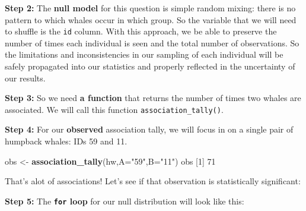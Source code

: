 \documentclass[]{book}
\newenvironment{Shaded}{\begin{snugshade}}{\end{snugshade}}
\newcommand{\ControlFlowTok}[1]{\textcolor[rgb]{0.13,0.29,0.53}{\textbf{#1}}}
\newcommand{\DataTypeTok}[1]{\textcolor[rgb]{0.13,0.29,0.53}{#1}}
\newcommand{\DecValTok}[1]{\textcolor[rgb]{0.00,0.00,0.81}{#1}}
\newcommand{\KeywordTok}[1]{\textcolor[rgb]{0.13,0.29,0.53}{\textbf{#1}}}
\newcommand{\NormalTok}[1]{#1}
\newcommand{\OperatorTok}[1]{\textcolor[rgb]{0.81,0.36,0.00}{\textbf{#1}}}
\newcommand{\StringTok}[1]{\textcolor[rgb]{0.31,0.60,0.02}{#1}}
\begin{document}
\textbf{Step 2:} The \textbf{null model} for this question is simple random mixing: there is no pattern to which whales occur in which group. So the variable that we will need to shuffle is the \texttt{id} column. With this approach, we be able to preserve the number of times each individual is seen and the total number of observations. So the limitations and inconsistencies in our sampling of each individual will be safely propagated into our statistics and properly reflected in the uncertainty of our results.

\textbf{Step 3:} So we need \textbf{a function} that returns the number of times two whales are associated. We will call this function \texttt{association\_tally()}.

\begin{Shaded}
\end{Shaded}

\textbf{Step 4:} For our \textbf{observed} association tally, we will focus in on a single pair of humpback whales: IDs 59 and 11.

\begin{Shaded}
\begin{Highlighting}[]
\NormalTok{obs <-}\StringTok{ }\KeywordTok{association_tally}\NormalTok{(hw,}\DataTypeTok{A=}\StringTok{"59"}\NormalTok{,}\DataTypeTok{B=}\StringTok{"11"}\NormalTok{)}
\NormalTok{obs}
\NormalTok{[}\DecValTok{1}\NormalTok{] }\DecValTok{71}
\end{Highlighting}
\end{Shaded}

That's alot of associations! Let's see if that observation is statistically significant:

\textbf{Step 5:} The \textbf{\texttt{for} loop} for our null distribution will look like this:
\end{document}
